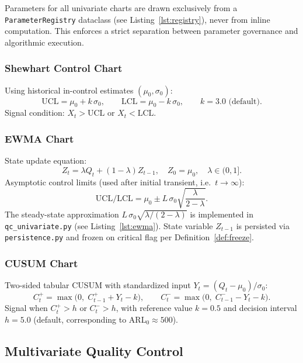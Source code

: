 \documentclass[11pt,a4paper]{article}
\begin{document}
Parameters for all univariate charts are drawn exclusively from a
\texttt{ParameterRegistry} dataclass (see Listing~\ref{lst:registry}),
never from inline computation. This enforces a strict separation between
parameter governance and algorithmic execution.

\subsubsection{Shewhart Control Chart}

Using historical in-control estimates $(\mu_0, \sigma_0)$:
\[
  \mathrm{UCL} = \mu_0 + k\,\sigma_0, \qquad
  \mathrm{LCL} = \mu_0 - k\,\sigma_0, \qquad k = 3.0 \text{ (default)}.
\]
Signal condition: $X_t > \mathrm{UCL}$ or $X_t < \mathrm{LCL}$.

\subsubsection{EWMA Chart}

State update equation:
\[
  Z_t = \lambda Q_t + (1 - \lambda) Z_{t-1}, \quad Z_0 = \mu_0,
  \quad \lambda \in (0, 1].
\]
Asymptotic control limits (used after initial transient, i.e.\ $t \to \infty$):
\[
  \mathrm{UCL/LCL} = \mu_0 \pm L\,\sigma_0\!\sqrt{\frac{\lambda}{2 - \lambda}}.
\]
The steady-state approximation $L\,\sigma_0\sqrt{\lambda/(2-\lambda)}$ is
implemented in \texttt{qc\_univariate.py} (see Listing~\ref{lst:ewma}).
State variable $Z_{t-1}$ is persisted via \texttt{persistence.py} and frozen
on critical flag per Definition~\ref{def:freeze}.

\subsubsection{CUSUM Chart}

Two-sided tabular CUSUM with standardized input
$Y_t = (Q_t - \mu_0)/\sigma_0$:
\[
  C_t^+ = \max\bigl(0,\; C_{t-1}^+ + Y_t - k\bigr), \qquad
  C_t^- = \max\bigl(0,\; C_{t-1}^- - Y_t - k\bigr).
\]
Signal when $C_t^+ > h$ or $C_t^- > h$, with reference value $k = 0.5$
and decision interval $h = 5.0$ (default, corresponding to ARL$_0 \approx 500$).

\subsection{Multivariate Quality Control}
\label{sec:multivariate}
\end{document}
